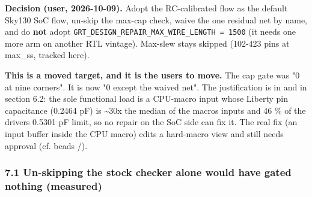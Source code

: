 \begin{record}

\textbf{Decision (user, 2026-10-09).} Adopt the RC-calibrated flow as
the default Sky130 SoC flow, un-skip the max-cap check, waive the one
residual net by name, and do \textbf{not} adopt
\texttt{GRT\_\allowbreak{}DESIGN\_\allowbreak{}REPAIR\_\allowbreak{}MAX\_\allowbreak{}WIRE\_\allowbreak{}LENGTH\ =\allowbreak{}\ 1500}
(it needs one more arm on another RTL vintage). Max-slew stays skipped
(102-423 pins at max\_ss, tracked here).

\textbf{This is a moved target, and it is the user\textquotesingle s to
move.} The cap gate was "0 at nine corners". It is now "0 except the
waived net". The justification is in
 and in section
6.2: the sole functional load is a CPU-macro input whose Liberty pin
capacitance (0.2464 pF) is \textasciitilde30x the median of the
macro\textquotesingle s inputs and 46 \% of the driver\textquotesingle s
0.5301 pF limit, so no repair on the SoC side can fix it. The real fix
(an input buffer inside the CPU macro) edits a hard-macro view and still
needs approval (cf. beads /).

\end{record}

\subsubsection{7.1 Un-skipping the stock checker alone would have gated
nothing (measured)}\label{cr:defect:sky130-slew-cap-e45j:71-un-skipping-the-stock-checker-alone-would-have-gated-nothing-measured}


